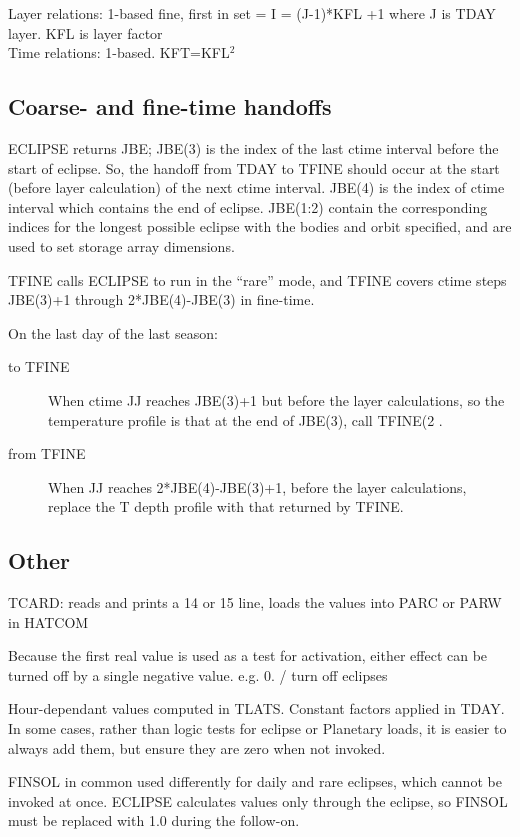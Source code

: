 \documentclass{article}
\begin{document}
Layer relations: 1-based
\qi  fine, first in set = I = (J-1)*KFL +1 where J is TDAY layer. KFL is layer factor
\\ 
Time relations: 1-based.  KFT=KFL$^2$

\subsection{Coarse- and fine-time handoffs}

ECLIPSE returns JBE;  JBE(3) is the index of the last ctime interval before
the start of eclipse. So, the handoff from TDAY to TFINE should occur at the
start (before layer calculation) of the next ctime interval. JBE(4) is the index
of ctime interval which contains the end of eclipse. JBE(1:2) contain the
corresponding indices for the longest possible eclipse with the bodies and orbit
specified, and are used to set storage array dimensions.

TFINE calls ECLIPSE to run in the ``rare'' mode, and TFINE covers ctime steps 
JBE(3)+1 through 2*JBE(4)-JBE(3) in fine-time.

On the last day of the last season: 
\begin{description}  %
\item [to TFINE] When ctime JJ reaches JBE(3)+1 but before the layer
  calculations, so the temperature profile is that at the end of JBE(3), call
  TFINE(2 .
\item [from TFINE] When JJ reaches 2*JBE(4)-JBE(3)+1, before the layer
  calculations, replace the T depth profile with that returned by TFINE.
\end{description}

\subsection{Other}

TCARD: reads and prints a 14 or 15 line, loads the values into PARC or PARW in
HATCOM

Because the first real value is used as a test for activation, either effect can
be turned off by a single negative value. e.g.  
 0. / turn off eclipses

Hour-dependant values computed in TLATS. Constant factors applied in TDAY.
\\ In some cases, rather than logic tests for eclipse or Planetary loads, it is
easier to always add them, but ensure they are zero when not invoked.

FINSOL in common used differently for daily and rare eclipses, which cannot be
invoked at once.  ECLIPSE calculates values only through the eclipse, so FINSOL
must be replaced with 1.0 during the follow-on.
\end{document}
